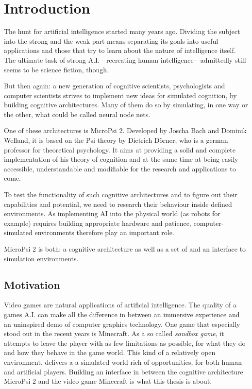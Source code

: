 \chapter{Introduction}
The hunt for artificial intelligence started many years ago. Dividing the subject into the strong and the weak part means separating its goals into useful applications and those that try to learn about the nature of intelligence itself. The ultimate task of strong A.I.---recreating human intelligence---admittedly still seems to be science fiction, though.

But then again: a new generation of cognitive scientists, psychologists and computer scientists strives to implement new ideas for simulated cognition, by building cognitive architectures. Many of them do so by simulating, in one way or the other, what could be called neural node nets.

One of these architectures is MicroPsi 2. Developed by Joscha Bach and Dominik Welland, it is based on the Psi theory by Dietrich Dörner, who is a german professor for theoretical psychology. It aims at providing a solid and complete implementation of his theory of cognition and at the same time at being easily accessible, understandable and modifiable for the research and applications to come.

To test the functionality of such cognitive architectures and to figure out their capabilities and potential, we need to research their behaviour inside defined environments. As implementing AI into the physical world (as robots for example) requires building appropriate hardware and patience, computer-simulated environments therefore play an important role.

MicroPsi 2 is both: a cognitive architecture as well as a set of and an interface to simulation environments.

\section{Motivation}
Video games are natural applications of artificial intelligence. The quality of a games A.I. can make all the difference in between an immersive experience and an uninspired demo of computer graphics technology. One game that especially stood out in the recent years is Minecraft. As a so called \emph{sandbox game}, it attempts to leave the player with as few limitations as possible, for what they do and how they behave in the game world. This kind of a relatively open environment, delivers a a simulated world rich of opportunities, for both human and artificial players. Building an interface in between the cognitive architecture MicroPsi 2 and the video game Minecraft is what this thesis is about.


